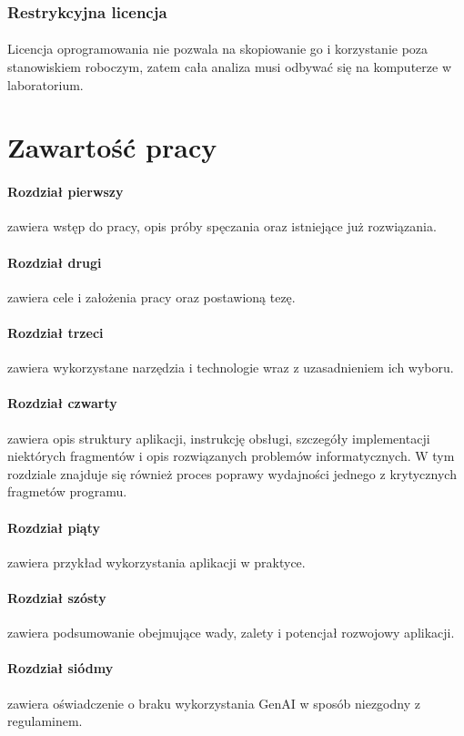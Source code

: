 \documentclass[12pt]{report}
\begin{document}
	\subsubsection{Restrykcyjna licencja}
	\paragraph{}
	Licencja oprogramowania nie pozwala na skopiowanie go i korzystanie poza stanowiskiem roboczym, zatem cała analiza musi odbywać się na komputerze w laboratorium.
	
	
	\section{Zawartość pracy}
	\paragraph{Rozdział pierwszy} zawiera wstęp do pracy, opis próby spęczania oraz istniejące już rozwiązania.
	\paragraph{Rozdział drugi} zawiera cele i założenia pracy oraz postawioną tezę.
	\paragraph{Rozdział trzeci} zawiera wykorzystane narzędzia i technologie wraz z uzasadnieniem ich wyboru.
	\paragraph{Rozdział czwarty} zawiera opis struktury aplikacji, instrukcję obsługi, szczegóły implementacji niektórych fragmentów i opis rozwiązanych problemów informatycznych. W tym rozdziale znajduje się również proces poprawy wydajności jednego z krytycznych fragmetów programu.
	\paragraph{Rozdział piąty} zawiera przykład wykorzystania aplikacji w praktyce.
	\paragraph{Rozdział szósty} zawiera podsumowanie obejmujące wady, zalety i potencjał rozwojowy aplikacji.
	\paragraph{Rozdział siódmy} zawiera oświadczenie o braku wykorzystania GenAI w sposób niezgodny z regulaminem.
\end{document}
